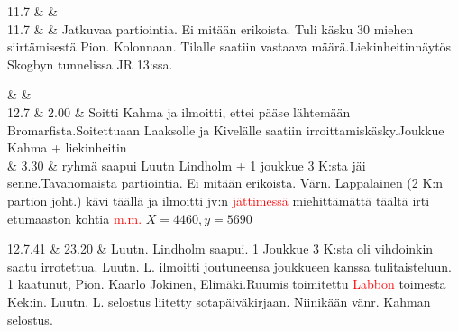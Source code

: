 \documentclass[11pt,a5paper,oneside]{book}
\begin{document}
11.7 & & \newline\newline\newline\newline\newline \\

11.7 & & Jatkuvaa partiointia. Ei mitään erikoista. Tuli käsku 30 miehen siirtämisestä Pion. Kolonnaan. Tilalle saatiin vastaava määrä.\newline Liekinheitinnäytös Skogbyn tunnelissa JR 13:ssa.\\ 
\newpage

& & \newline\newline\newline\newline\newline\newline \\

12.7 & 2.00 & Soitti Kahma ja ilmoitti, ettei pääse lähtemään Bromarfista.\newline Soitettuaan Laaksolle ja Kivelälle saatiin irroittamiskäsky.\newline Joukkue Kahma + liekinheitin \\

& 3.30 & ryhmä saapui \newline Luutn Lindholm + 1 joukkue 3 K:sta jäi senne.\newline\newline Tavanomaista partiointia. Ei mitään erikoista. Värn. Lappalainen (2 K:n partion joht.) kävi täällä ja ilmoitti jv:n \textcolor{red}{jättimessä} miehittämättä täältä irti etumaaston kohtia \textcolor{red}{m.m.} $X=4460, y=5690$ \\

\taulustop


12.7.41 & 23.20 & Luutn. Lindholm saapui. 1 Joukkue 3 K:sta oli vihdoinkin saatu irrotettua. Luutn. L. ilmoitti joutuneensa joukkueen kanssa tulitaisteluun. 1 kaatunut, \newline Pion. Kaarlo Jokinen, Elimäki.\newline Ruumis toimitettu \textcolor{red}{Labbon} toimesta Kek:in. Luutn. L. selostus liitetty sotapäiväkirjaan. Niinikään vänr. Kahman selostus.\newline\newline\newline\newline\newline \\ 
\end{document}
